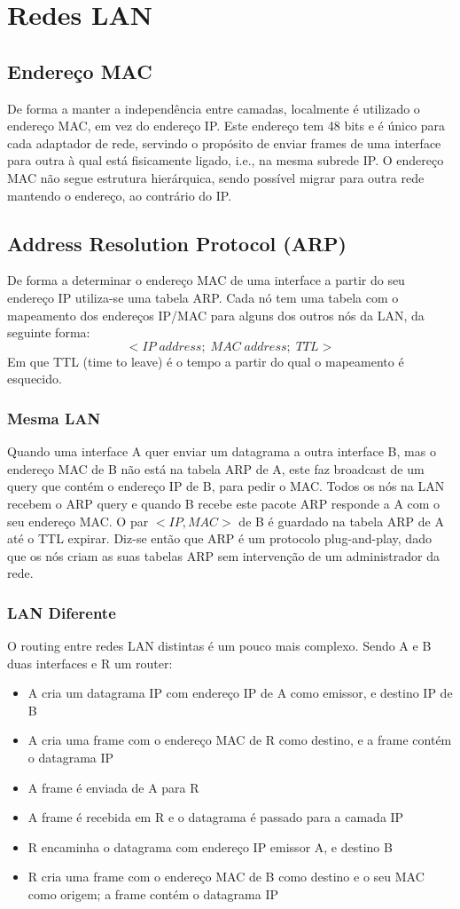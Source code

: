 \documentclass[10pt,a4paper]{report}
\begin{document}
\section{Redes LAN}
\subsection{Endereço MAC}
De forma a manter a independência entre camadas, localmente é utilizado o endereço MAC, em vez do endereço IP. Este endereço tem 48 bits e é único para cada adaptador de rede, servindo o propósito de enviar frames de uma interface para outra à qual está fisicamente ligado, i.e., na mesma subrede IP. O endereço MAC não segue estrutura hierárquica, sendo possível migrar para outra rede mantendo o endereço, ao contrário do IP.
\subsection{Address Resolution Protocol (ARP)}
De forma a determinar o endereço MAC de uma interface a partir do seu endereço IP utiliza-se uma tabela ARP. Cada nó tem uma tabela com o mapeamento dos endereços IP/MAC para alguns dos outros nós da LAN, da seguinte forma:
$$
< IP\;address;\;MAC\;address;\;TTL>
$$
Em que TTL (time to leave) é o tempo a partir do qual o mapeamento é esquecido.
\subsubsection{Mesma LAN}
Quando uma interface A quer enviar um datagrama a outra interface B, mas o endereço MAC de B não está na tabela ARP de A, este faz broadcast de um query que contém o endereço IP de B, para pedir o MAC. Todos os nós na LAN recebem o ARP query e quando B recebe este pacote ARP responde a A com o seu endereço MAC. O par $<IP,MAC>$ de B é guardado na tabela ARP de A até o TTL expirar. Diz-se então que ARP é um protocolo plug-and-play, dado que os nós criam as suas tabelas ARP sem intervenção de um administrador da rede.
\subsubsection{LAN Diferente}
O routing entre redes LAN distintas é um pouco mais complexo. Sendo A e B duas interfaces e R um router:
\begin{itemize}
\item A cria um datagrama IP com endereço IP de A como emissor, e destino IP de B
\item A cria uma frame com o endereço MAC de R como destino, e a frame contém o datagrama IP
\item A frame é enviada de A para R
\item A frame é recebida em R e o datagrama é passado para a camada IP
\item R encaminha o datagrama com endereço IP emissor A, e destino B
\item R cria uma frame com o endereço MAC de B como destino e o seu MAC como origem; a frame contém o datagrama IP
\end{itemize}
\end{document}
